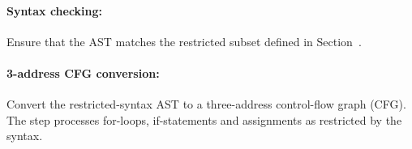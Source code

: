         \paragraph{Syntax checking:}
        Ensure that the AST matches the restricted subset defined in Section~.
        \squeeze
        \paragraph{3-address CFG conversion:}
        Convert the restricted-syntax AST to a three-address control-flow graph (CFG). The step processes for-loops, if-statements and assignments as restricted by the syntax.
